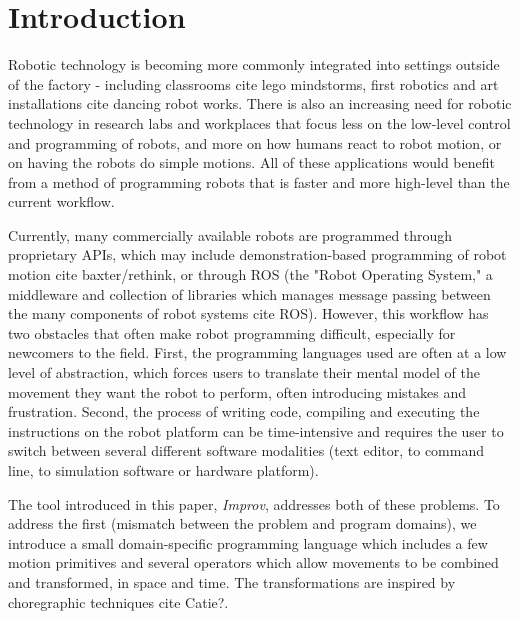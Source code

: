 \documentclass[sigconf]{acmart}
\begin{document}
%
%



\maketitle


\section{Introduction}\label{introduction}

Robotic technology is becoming more commonly integrated into settings outside of
the factory - including classrooms {\color{red} cite lego mindstorms, first 
robotics} and art installations {\color{red} cite dancing robot works}. There
is also an increasing need for robotic technology in research labs and
workplaces that
focus less on the low-level control and programming of robots, and more on how
humans react to robot motion, or on having the robots do simple motions. All of
these applications would benefit from a method of programming robots that is
faster and more high-level than the current workflow.

Currently, many commercially available robots are programmed through proprietary
APIs, which may include demonstration-based programming of robot motion
{\color{red} cite baxter/rethink}, or through ROS (the "Robot Operating System,"
a middleware and collection of libraries which manages message passing between
the many components of robot systems {\color{red} cite ROS}). However, this
workflow has two obstacles that often make robot programming difficult,
especially for newcomers to the field. First, the programming languages used are
often at a low level of abstraction, which forces users to translate their
mental model of the movement they want the robot to perform, often introducing
mistakes and frustration. Second, the process of writing code, compiling and
executing the instructions on the robot platform can be time-intensive and
requires the user to switch between several different software modalities (text
editor, to command line, to simulation software or hardware platform).

The tool introduced in this paper, \emph{Improv}, addresses both of these
problems. To address the first (mismatch between the problem and
program domains), we introduce a small domain-specific programming language
which includes a few motion primitives and several operators which allow
movements to be combined and transformed, in space and time. The transformations
are inspired by choregraphic techniques {\color{red} cite Catie?}. 
\end{document}
